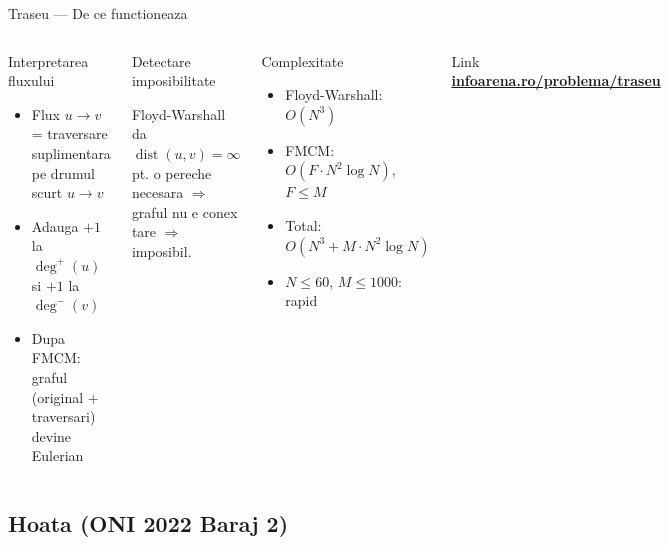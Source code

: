 ﻿\documentclass[9pt]{beamer}
\newcommand{\dist}{\operatorname{dist}}
\begin{document}
\begin{frame}{Traseu --- De ce functioneaza}
  \begin{columns}[T]
    \begin{block}{Interpretarea fluxului}
      \begin{scriptsize}
      \begin{itemize}\itemsep0pt
        \item Flux $u\to v$ = traversare suplimentara pe drumul scurt $u\to v$
        \item Adauga $+1$ la $\deg^+(u)$ si $+1$ la $\deg^-(v)$
        \item Dupa FMCM: graful (original $+$ traversari) devine Eulerian
      \end{itemize}
      \end{scriptsize}
    \end{block}
    \smallskip
    \begin{exampleblock}{Detectare imposibilitate}
      \begin{scriptsize}
      Floyd-Warshall da $\dist(u,v)=\infty$ pt. o pereche necesara
      $\Rightarrow$ graful nu e conex tare $\Rightarrow$ imposibil.
      \end{scriptsize}
    \end{exampleblock}
    \begin{alertblock}{Complexitate}
      \begin{scriptsize}
      \begin{itemize}\itemsep0pt
        \item Floyd-Warshall: $O(N^3)$
        \item FMCM: $O(F\!\cdot\! N^2\log N)$, $F\leq M$
        \item Total: $O(N^3 + M\!\cdot\! N^2\log N)$
        \item $N\leq 60$, $M\leq 1000$: rapid
      \end{itemize}
      \end{scriptsize}
    \end{alertblock}
    \begin{block}{Link}
      \footnotesize
      \href{https://www.infoarena.ro/problema/traseu}{\textbf{infoarena.ro/problema/traseu}}
    \end{block}
  \end{columns}
\end{frame}

\subsection*{Hoata (ONI 2022 Baraj 2)}
\end{document}
